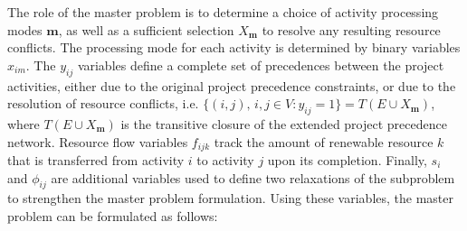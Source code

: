 \documentclass[a4paper,abstracton]{scrartcl}
\begin{document}
The role of the master problem is to determine a choice of activity processing modes $\bm{m}$, as well as a sufficient selection $X_{\bm{m}}$ to resolve any resulting resource conflicts. The processing mode for each activity is determined by binary variables $x_{im}$. The $y_{ij}$ variables define a complete set of precedences between the project activities, either due to the original project precedence constraints, or due to the resolution of resource conflicts, i.e. $\{(i,j),\, i,j\in V:y_{ij}=1\}=T(E\cup X_{\bm{m}})$, where $T(E\cup X_{\bm{m}})$ is the transitive closure of the extended project precedence network. Resource flow variables $f_{ijk}$ track the amount of renewable resource $k$ that is transferred from activity $i$ to activity $j$ upon its completion. Finally, $s_i$ and $\phi_{ij}$ are additional variables used to define two relaxations of the subproblem to strengthen the master problem formulation. Using these variables, the master problem can be formulated as follows:  
\end{document}
